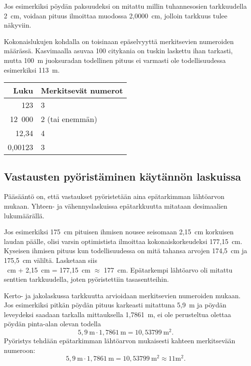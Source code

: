 
Jos esimerkiksi pöydän paksuudeksi on mitattu millin tuhannesosien
tarkkuudella 2~cm, voidaan pituus ilmoittaa muodossa 2,0000~cm, jolloin tarkkuus tulee näkyviin. 

Kokonaislukujen kohdalla on toisinaan epäselvyyttä merkitsevien numeroiden määrässä. Kasvimaalla asuvaa 100 citykania on tuskin laskettu ihan tarkasti,
mutta 100~m juoksuradan todellinen pituus ei varmasti ole todellisuudessa
esimerkiksi 113~m.

\begin{center}
\begin{tabular}{r|l}
Luku & Merkitsevät numerot \\
\hline
123 & 3 \\
12~000 & 2 (tai enemmän)\\
12,34 & 4 \\
0,00123 & 3
\end{tabular}
\end{center}

\subsection*{Vastausten pyöristäminen käytännön laskuissa}

Pääsääntö on, että vastaukset pyöristetään aina epätarkimman
lähtöarvon mukaan. Yhteen- ja vähennyslaskuissa epätarkkuutta
mitataan desimaalien lukumäärällä.

Jos esimerkiksi 175~cm pituisen ihmisen
nousee seisomaan 2,15~cm korkuisen laudan päälle, olisi varsin
optimistista ilmoittaa kokonaiskorkeudeksi 177,15~cm. Kyseisen ihmisen pituus kun todellisuudessa on mitä tahansa arvojen
174,5~cm ja 175,5~cm väliltä. Lasketaan siis\\
~cm + 2,15~cm = 177,15~cm $\approx$ 177~cm. 
Epätarkempi lähtöarvo oli mitattu senttien tarkkuudella, joten pyöristettiin tasasentteihin.

Kerto- ja jakolaskussa tarkkuutta arvioidaan merkitsevien numeroiden mukaan. Jos esimerkiksi pitkän pöydän pituus karkeasti
mitattuna 5,9~m ja pöydän leveydeksi saadaan tarkalla mittauksella
1,7861~m, ei ole perusteltua olettaa pöydän pinta-alan olevan todella
\[ 5,9~\textrm{m} \cdot 1,7861~\textrm{m} = 10,53799~\textrm{m}^2. \] 
Pyöristys tehdään epätarkimman
lähtöarvon mukaisesti kahteen merkitsevään numeroon:
\[ 5,9~\textrm{m} \cdot 1,7861~\textrm{m} = 10,53799~\textrm{m}^2 \approx 11 \textrm{m}^2.\] 

